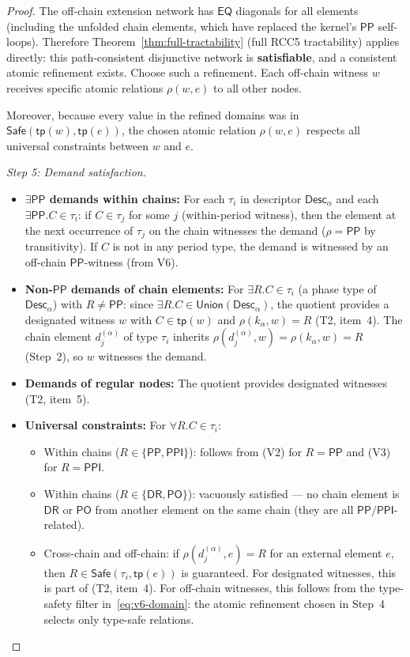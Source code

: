 \documentclass[a4paper,11pt]{article}
\theoremstyle{definition}
\newcommand{\DR}{\ensuremath{\mathsf{DR}}}
\newcommand{\PO}{\ensuremath{\mathsf{PO}}}
\newcommand{\EQ}{\ensuremath{\mathsf{EQ}}}
\newcommand{\PP}{\ensuremath{\mathsf{PP}}}
\newcommand{\PPI}{\ensuremath{\mathsf{PPI}}}
\newcommand{\tp}{\ensuremath{\mathsf{tp}}}
\newcommand{\Desc}{\ensuremath{\mathsf{Desc}}}
\newcommand{\Union}{\ensuremath{\mathsf{Union}}}
\newcommand{\Safe}{\ensuremath{\mathsf{Safe}}}
\begin{document}
\begin{proof}
The off-chain extension network has $\EQ$ diagonals for all elements
(including the unfolded chain elements, which have replaced the
kernel's $\PP$ self-loops).  Therefore
Theorem~\ref{thm:full-tractability} (full RCC5 tractability) applies
directly: this path-consistent disjunctive network is
\textbf{satisfiable}, and a consistent atomic refinement exists.
Choose such a refinement.  Each off-chain witness $w$ receives
specific atomic relations $\rho(w, e)$ to all other nodes.

Moreover, because every value in the refined domains was in
$\Safe(\tp(w), \tp(e))$, the chosen atomic relation $\rho(w, e)$
respects all universal constraints between $w$ and $e$.

\medskip\noindent\textit{Step 5: Demand satisfaction.}\;
\begin{itemize}
\item \textbf{$\exists\PP$ demands within chains:} For each
  $\tau_i$ in descriptor $\Desc_\alpha$ and each $\exists\PP.C \in
  \tau_i$: if $C \in \tau_j$ for some $j$ (within-period witness),
  then the element at the next occurrence of $\tau_j$ on the chain
  witnesses the demand ($\rho = \PP$ by transitivity).  If $C$ is
  not in any period type, the demand is witnessed by an off-chain
  $\PP$-witness (from V6).

\item \textbf{Non-$\PP$ demands of chain elements:} For
  $\exists R.C \in \tau_i$ (a phase type of $\Desc_\alpha$) with
  $R \ne \PP$: since $\exists R.C \in \Union(\Desc_\alpha)$, the
  quotient provides a designated witness $w$ with $C \in \tp(w)$ and
  $\rho(k_\alpha, w) = R$ (T2, item~4).  The chain element
  $d_j^{(\alpha)}$ of type $\tau_i$ inherits
  $\rho(d_j^{(\alpha)}, w) = \rho(k_\alpha, w) = R$ (Step~2), so
  $w$ witnesses the demand.

\item \textbf{Demands of regular nodes:} The quotient provides
  designated witnesses (T2, item~5).

\item \textbf{Universal constraints:} For $\forall R.C \in \tau_i$:
  \begin{itemize}
  \item Within chains ($R \in \{\PP, \PPI\}$): follows from (V2) for
    $R = \PP$ and (V3) for $R = \PPI$.
  \item Within chains ($R \in \{\DR, \PO\}$): vacuously satisfied
    --- no chain element is $\DR$ or $\PO$ from another element on
    the same chain (they are all $\PP/\PPI$-related).
  \item Cross-chain and off-chain: if $\rho(d_j^{(\alpha)}, e) = R$
    for an external element $e$, then $R \in \Safe(\tau_i, \tp(e))$
    is guaranteed.  For designated witnesses, this is part of (T2,
    item~4).  For off-chain witnesses, this follows from the
    type-safety filter in~\eqref{eq:v6-domain}: the atomic refinement
    chosen in Step~4 selects only type-safe relations.
  \end{itemize}
\end{itemize}


\end{proof}
\end{document}
